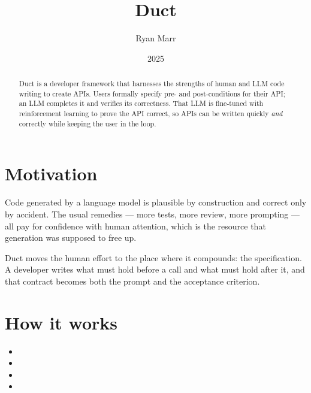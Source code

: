 \documentclass{article}
\title{Duct}
\author{Ryan Marr}
\date{2025}
\begin{document}
\maketitle

\begin{abstract}
Duct is a developer framework that harnesses the strengths of human and LLM code
writing to create APIs. Users formally specify pre- and post-conditions for their
API; an LLM completes it and verifies its correctness. That LLM is fine-tuned with
reinforcement learning to prove the API correct, so APIs can be written quickly
\emph{and} correctly while keeping the user in the loop.
\end{abstract}

\section{Motivation}

Code generated by a language model is plausible by construction and correct only by
accident. The usual remedies --- more tests, more review, more prompting --- all
pay for confidence with human attention, which is the resource that generation was
supposed to free up.

Duct moves the human effort to the place where it compounds: the specification. A
developer writes what must hold before a call and what must hold after it, and that
contract becomes both the prompt and the acceptance criterion.

\section{How it works}

\begin{itemize}
  \item {}

  \item {}

  \item {}

  \item {}
\end{itemize}
\end{document}
